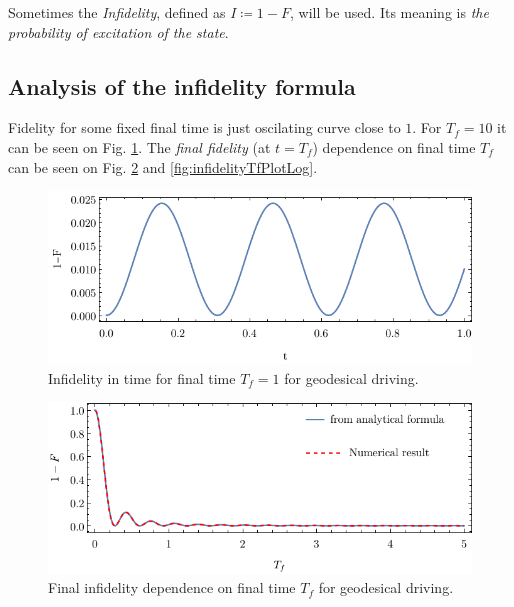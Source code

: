Sometimes the \emph{Infidelity}, defined as $I\coloneqq 1-F$, will be used. Its meaning is \emph{the probability of excitation of the state}.


\subsection{Analysis of the infidelity formula}
Fidelity for some fixed final time is just oscilating curve close to $1$. For $T_f=10$ it can be seen on Fig. \ref{fig:infidelityTimePlot}. The \emph{final fidelity} (at $t=T_f$) dependence on final time $T_f$ can be seen on Fig. \ref{fig:infidelityTfPlot} and \ref{fig:infidelityTfPlotLog}.
\begin{figure}[H]
    \centering
    \includegraphics[scale=1.2]{../img/infidelityTimePlotGeod.pdf}
    \caption{Infidelity in time for final time $T_f=1$ for geodesical driving.}
  \label{fig:infidelityTimePlot}
\end{figure}

\vspace{-10pt}\begin{figure}[H]
    \centering
    \includegraphics[scale=1.2]{../img/infidelityTfPlot.pdf}
    \caption{Final infidelity dependence on final time $T_f$ for geodesical driving.}
    \label{fig:infidelityTfPlot}
\end{figure}

